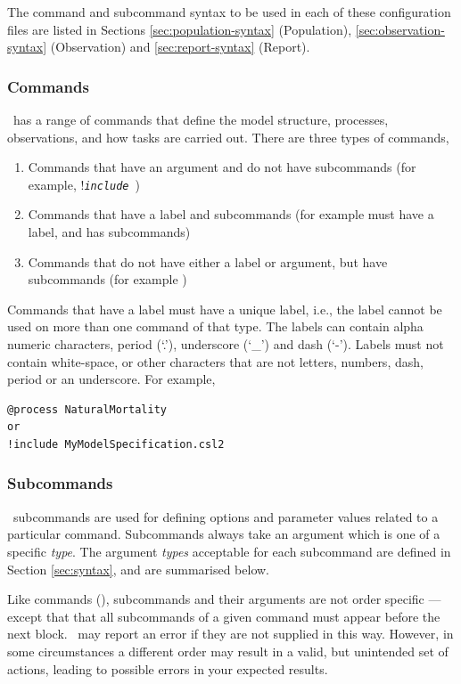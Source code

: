 The command and subcommand syntax to be used in each of these configuration files are listed in Sections \ref{sec:population-syntax} (Population), \ref{sec:observation-syntax} (Observation) and \ref{sec:report-syntax} (Report).

\subsubsection{Commands}

\IBM\ has a range of commands that define the model structure, processes, observations, and how tasks are carried out. There are three types of commands, 

\begin{enumerate}
\item Commands that have an argument and do not have subcommands (for example, !\texttt{\emph{include}}\ )
\item Commands that have a label and subcommands (for example  must have a label, and has subcommands)
\item Commands that do not have either a label or argument, but have subcommands (for example )
\end{enumerate}

Commands that have a label must have a unique label, i.e., the label cannot be used on more than one command of that type. The labels can contain alpha numeric characters, period (`.'), underscore (`\_') and dash (`-'). Labels must not contain white-space, or other characters that are not letters, numbers, dash, period or an underscore. For example,

{\small{\begin{verbatim}
@process NaturalMortality
or
!include MyModelSpecification.csl2
		\end{verbatim}}}

\subsubsection{Subcommands}

\IBM\ subcommands are used for defining options and parameter values related to a particular command. Subcommands always take an argument which is one of a specific \emph{type}. The argument \emph{types} acceptable for each subcommand are defined in Section \ref{sec:syntax}, and are summarised below. 

Like commands (), subcommands and their arguments are not order specific --- except that that all subcommands of a given command must appear before the next  block. \IBM\ may report an error if they are not supplied in this way. However, in some circumstances a different order may result in a valid, but unintended set of actions, leading to possible errors in your expected results.  

